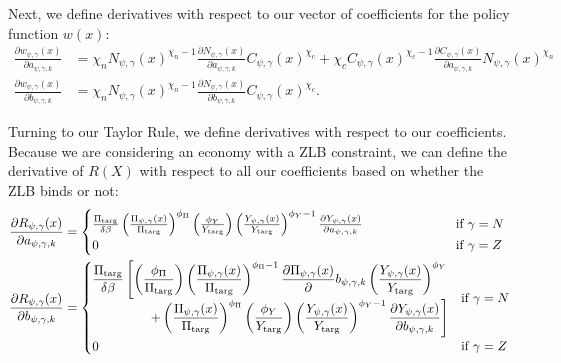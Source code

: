 \documentclass[11pt]{article}
\begin{document}
Next, we define derivatives with respect to our vector of coefficients for the policy function $w(x)$: 
\begin{align}
\frac{\partial w_{\psi,\gamma}(x)}{\partial a_{\psi,\gamma,k}} &=\chi_nN_{\psi,\gamma}(x)^{\chi_n-1}\frac{\partial N_{\psi,\gamma}(x)}{\partial a_{\psi,\gamma,k}}C_{\psi,\gamma}(x)^{\chi_c} + \chi_cC_{\psi,\gamma}(x)^{\chi_c-1}\frac{\partial C_{\psi,\gamma}(x)}{\partial a_{\psi,\gamma,k}}N_{\psi,\gamma}(x)^{\chi_n} \\ 
\frac{\partial w_{\psi,\gamma}(x)}{\partial b_{\psi,\gamma,k}} &=\chi_nN_{\psi,\gamma}(x)^{\chi_n-1}\frac{\partial N_{\psi,\gamma}(x)}{\partial b_{\psi,\gamma,k}}C_{\psi,\gamma}(x)^{\chi_c}.
\end{align}

Turning to our Taylor Rule, we define derivatives with respect to our coefficients. Because we are considering an economy with a ZLB constraint, we can define the derivative of $R(X)$ with respect to all our coefficients based on whether the ZLB binds or not:
\begin{align}
\frac{\partial R_{\psi,\gamma}(x)}{\partial a_{\psi,\gamma,k}} &=
\begin{cases}
\frac{\Pi_{\text{targ}}}{\delta\beta}\left(\frac{\Pi_{\psi,\gamma}(x)}{\Pi_{\text{targ}}}\right)^{\phi_{\Pi}}\left(\frac{\phi_Y}{Y_{\text{targ}}}\right)\left(\frac{Y_{\psi,\gamma}(x)}{Y_{\text{targ}}}\right)^{\phi_{Y}-1}\frac{\partial Y_{\psi,\gamma}(x)}{\partial a_{\psi,\gamma,k}}  & \hspace{2.2cm} \text{if } \gamma = N\\
0  & \hspace{2.2cm} \text{if } \gamma = Z
\end{cases}\\
\frac{\partial R_{\psi,\gamma}(x)}{\partial b_{\psi,\gamma,k}} &= \begin{cases}
\begin{aligned}
\frac{\Pi_{\text{targ}}}{\delta\beta}\left[\left(\frac{\phi_{\Pi}}{\Pi_{\text{targ}}}\right)\left(\frac{\Pi_{\psi,\gamma}(x)}{\Pi_{\text{targ}}}\right)^{\phi_{\Pi}-1}\frac{\partial \Pi_{\psi,\gamma}(x)}\partial b_{\psi,\gamma,k}\left(\frac{Y_{\psi,\gamma}(x)}{Y_{\text{targ}}}\right)^{\phi_{Y}} \right. \\
\left. + \left(\frac{\Pi_{\psi,\gamma}(x)}{\Pi_{\text{targ}}}\right)^{\phi_{\Pi}}\left(\frac{\phi_Y}{Y_{\text{targ}}}\right)\left(\frac{Y_{\psi,\gamma}(x)}{Y_{\text{targ}}}\right)^{\phi_{Y}-1}\frac{\partial Y_{\psi,\gamma}(x)}{\partial b_{\psi,\gamma,k}}\right]
\end{aligned}
&\text{if } \gamma = N\\
0  & \text{if } \gamma = Z
\end{cases}
\end{align}
\end{document}
